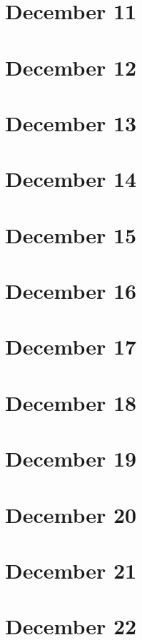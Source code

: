 \section{December 11}

\section{December 12}

\section{December 13}

\section{December 14}

\section{December 15}

\section{December 16}

\section{December 17}

\section{December 18}

\section{December 19}

\section{December 20}

\section{December 21}

\section{December 22}

